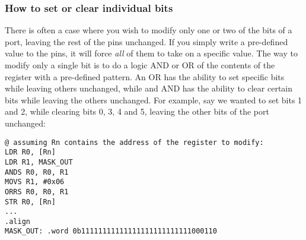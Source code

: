 \subsubsection{How to set or clear individual bits}
\label{sec:set_clear_individual_bits}
There is often a case where you wish to modify only one or two of the bits of a port, leaving the rest of the pins unchanged. If you simply write a pre-defined value to the pins, it will force \emph{all} of them to take on a specific value. The way to modify only a single bit is to do a logic AND or OR of the contents of the register with a pre-defined pattern. An OR has the ability to set specific bits while leaving others unchanged, while and AND has the ability to clear certain bits while leaving the others unchanged. For example, say we wanted to set bits 1 and 2, while clearing bits 0, 3, 4 and 5, leaving the other bits of the port unchanged:
\begin{lstlisting}[fontadjust=true,frame=trBL]
@ assuming Rn contains the address of the register to modify:
LDR R0, [Rn]    
LDR R1, MASK_OUT
ANDS R0, R0, R1
MOVS R1, #0x06
ORRS R0, R0, R1
STR R0, [Rn]
...
.align
MASK_OUT: .word 0b11111111111111111111111111000110
\end{lstlisting}


